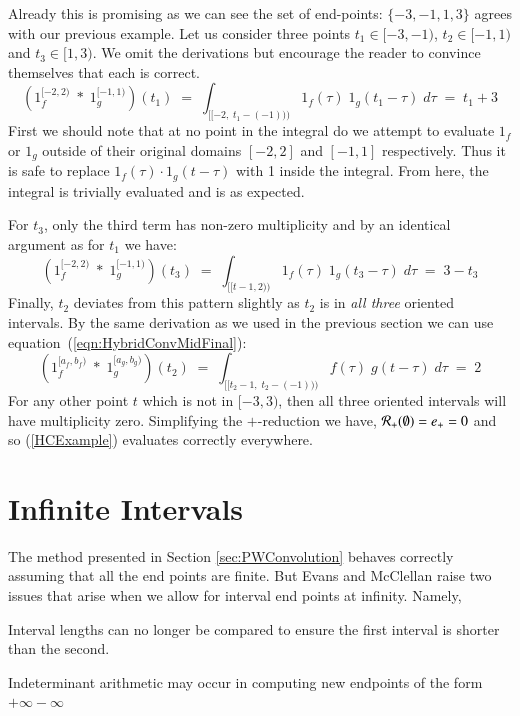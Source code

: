 Already this is promising as we can see the set of end-points: $\{-3, -1, 1, 3\}$ agrees with our previous example.
Let us consider three points $t_1 \in [-3, -1)$, $t_2 \in [-1, 1)$ and $t_3 \in [1,3)$.
We omit the derivations but encourage the reader to convince themselves that each is correct.
\begin{equation*}
	(1_f^{[-2,2)} \;*\; 1_g^{[-1,1)}) (t_1) 
		\;=\; \int_{[\![-2,\;t_1-(-1))\!)} 1_f(\tau) \; 1_g(t_1-\tau) \; d\tau
		\;=\; t_1 + 3
\end{equation*}
First we should note that at no point in the integral do we attempt to evaluate $1_f$ or $1_g$ outside of their original 
domains $[-2,2]$ and $[-1,1]$ respectively. 
Thus it is safe to replace $1_f(\tau)\cdot 1_g(t-\tau)$ with 1  inside the integral.
From here, the integral is trivially evaluated and is as expected.


For $t_3$, only the third term has non-zero multiplicity and by an identical argument as for $t_1$ we have:
\begin{equation*}
	(1_f^{[-2,2)} \;*\; 1_g^{[-1,1)}) (t_3) 
		\;=\; \int_{[\![t-1,2)\!)} 1_f(\tau) \; 1_g(t_3-\tau) \; d\tau
		\;=\; 3 - t_3
\end{equation*}
Finally, $t_2$ deviates from this pattern slightly as $t_2$ is in \emph{all three} oriented intervals.
By the same derivation as we used in the previous section we can use equation~(\ref{eqn:HybridConvMidFinal}):
\begin{equation*}
	\label{eqn:HCExampleT2}
	(1_f^{[a_f,b_f)} \;*\; 1_g^{[a_g,b_g)}) (t_2) 
		\;=\; \int_{[\![t_2-1,\;t_2-(-1))\!)} f(\tau) \; g(t-\tau) \; d\tau
		\;=\; 2
\end{equation*}
For any other point $t$ which is not in $[-3, 3)$, then all three oriented intervals will have multiplicity zero.
Simplifying the $+$-reduction we have, $\R[+](\emptyset) = e_+ = 0$ and so (\ref{HCExample}) evaluates correctly 
everywhere.





%
%
\section{Infinite Intervals}\label{sec:ConvInfty}


The method presented in Section \ref{sec:PWConvolution} behaves correctly assuming that all the end points are finite.
But Evans and McClellan \cite{evans1994algorithms} raise two issues that arise when we allow for interval end points at
infinity. Namely,
\begin{enumerate*}
	\item Interval lengths can no longer be compared to ensure the first interval is shorter than the second.
	\item Indeterminant arithmetic may occur in computing new endpoints of the form $+\infty-\infty$
\end{enumerate*}


